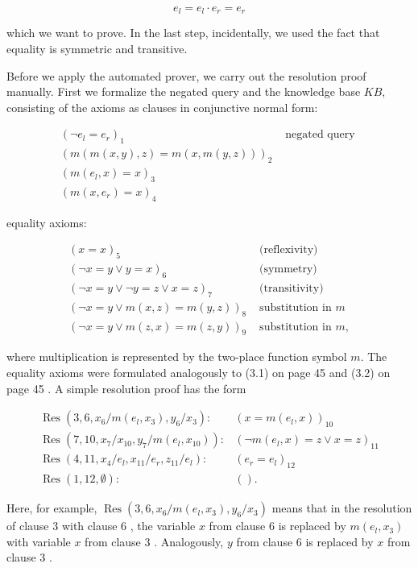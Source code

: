 \documentclass[10pt]{book}
\begin{document}
$$
e_{l}=e_{l} \cdot e_{r}=e_{r}
$$

which we want to prove. In the last step, incidentally, we used the fact that equality is symmetric and transitive.

Before we apply the automated prover, we carry out the resolution proof manually. First we formalize the negated query and the knowledge base $K B$, consisting of the axioms as clauses in conjunctive normal form:

$$
\begin{array}{ll}
\left(\neg e_{l}=e_{r}\right)_{1} & \text { negated query } \\
(m(m(x, y), z)=m(x, m(y, z)))_{2} & \\
\left(m\left(e_{l}, x\right)=x\right)_{3} & \\
\left(m\left(x, e_{r}\right)=x\right)_{4} &
\end{array}
$$

equality axioms:

$$
\begin{array}{ll}
(x=x)_{5} & \text { (reflexivity) } \\
(\neg x=y \vee y=x)_{6} & \text { (symmetry) } \\
(\neg x=y \vee \neg y=z \vee x=z)_{7} & \text { (transitivity) } \\
(\neg x=y \vee m(x, z)=m(y, z))_{8} & \text { substitution in } m \\
(\neg x=y \vee m(z, x)=m(z, y))_{9} & \text { substitution in } m,
\end{array}
$$

where multiplication is represented by the two-place function symbol $m$. The equality axioms were formulated analogously to (3.1) on page 45 and (3.2) on page 45 . A simple resolution proof has the form

$$
\begin{array}{ll}
\operatorname{Res}\left(3,6, x_{6} / m\left(e_{l}, x_{3}\right), y_{6} / x_{3}\right): & \left(x=m\left(e_{l}, x\right)\right)_{10} \\
\operatorname{Res}\left(7,10, x_{7} / x_{10}, y_{7} / m\left(e_{l}, x_{10}\right)\right): & \left(\neg m\left(e_{l}, x\right)=z \vee x=z\right)_{11} \\
\operatorname{Res}\left(4,11, x_{4} / e_{l}, x_{11} / e_{r}, z_{11} / e_{l}\right): & \left(e_{r}=e_{l}\right)_{12} \\
\operatorname{Res}(1,12, \emptyset): & () .
\end{array}
$$

Here, for example, $\operatorname{Res}\left(3,6, x_{6} / m\left(e_{l}, x_{3}\right), y_{6} / x_{3}\right)$ means that in the resolution of clause 3 with clause 6 , the variable $x$ from clause 6 is replaced by $m\left(e_{l}, x_{3}\right)$ with variable $x$ from clause 3 . Analogously, $y$ from clause 6 is replaced by $x$ from clause 3 .
\end{document}
